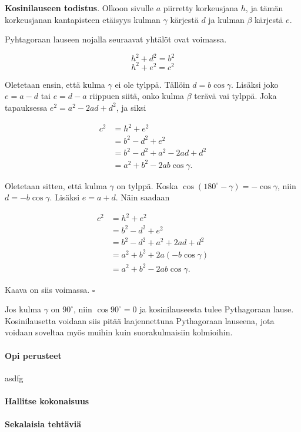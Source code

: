 \textbf{Kosinilauseen todistus}. Olkoon sivulle $a$ piirretty korkeusjana $h$, ja tämän
korkeusjanan kantapisteen etäisyys kulman $\gamma$ kärjestä $d$ ja kulman $\beta$ kärjestä $e$.



Pyhtagoraan lauseen nojalla seuraavat yhtälöt ovat voimassa.

\[
h^2 + d^2 = b^2
\]
\[
h^2 + e^2 = c^2
\]

Oletetaan ensin, että kulma $\gamma$ ei ole tylppä. Tällöin $d = b \cos \gamma$.
Lisäksi joko $e = a - d$ tai $e = d - a$ riippuen siitä, onko kulma $\beta$ terävä vai
tylppä. Joka tapauksessa $e^2 = a^2 - 2ad + d^2$, ja siksi

\begin{align*}
c^2 &= h^2 + e^2 \\
&= b^2 - d^2 + e^2 \\
&= b^2 - d^2 + a^2 - 2 a d + d^2 \\
&= a^2 + b^2 - 2 a b \cos \gamma .
\end{align*}

Oletetaan sitten, että kulma $\gamma$ on tylppä. Koska $\cos (180^{\circ} - \gamma )
= - \cos \gamma$, niin $d = -b \cos \gamma$. Lisäksi $e = a + d$. Näin saadaan

\begin{align*}
c^2 &= h^2 + e^2 \\
&= b^2 - d^2 + e^2 \\
&= b^2 - d^2 + a^2 + 2 a d + d^2 \\
&= a^2 + b^2 + 2 a(- b \cos \gamma ) \\
&= a^2 + b^2 - 2 a b \cos \gamma .
\end{align*}

Kaava on siis voimassa. $\square$

Jos kulma $\gamma$ on $90^\circ$, niin $\cos 90^\circ=0$ ja kosinilauseesta tulee Pythagoraan lause. Kosinilausetta voidaan siis pitää laajennettuna Pythagoraan lauseena, jota voidaan soveltaa myös muihin kuin suorakulmaisiin kolmioihin.

\paragraph*{Opi perusteet}

\begin{tehtava}
asdfg
\end{tehtava}

\paragraph*{Hallitse kokonaisuus}

\paragraph*{Sekalaisia tehtäviä}